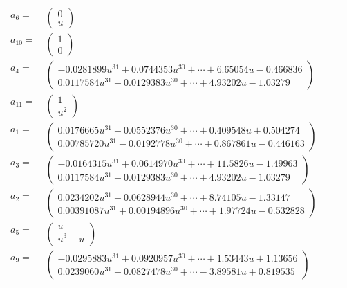\documentclass[1p]{elsarticle_modified}
\theoremstyle{definition}
\begin{document}
\begin{tabular}{m{7pt} m{180pt} m{7pt} m{180pt} }
\flushright $a_{6}=$&$\begin{pmatrix}0\\u\end{pmatrix}$ \\
\flushright $a_{10}=$&$\begin{pmatrix}1\\0\end{pmatrix}$ \\
\flushright $a_{4}=$&$\begin{pmatrix}-0.0281899 u^{31}+0.0744353 u^{30}+\cdots+6.65054 u-0.466836\\0.0117584 u^{31}-0.0129383 u^{30}+\cdots+4.93202 u-1.03279\end{pmatrix}$ \\
\flushright $a_{11}=$&$\begin{pmatrix}1\\u^2\end{pmatrix}$ \\
\flushright $a_{1}=$&$\begin{pmatrix}0.0176665 u^{31}-0.0552376 u^{30}+\cdots+0.409548 u+0.504274\\0.00785720 u^{31}-0.0192778 u^{30}+\cdots+0.867861 u-0.446163\end{pmatrix}$ \\
\flushright $a_{3}=$&$\begin{pmatrix}-0.0164315 u^{31}+0.0614970 u^{30}+\cdots+11.5826 u-1.49963\\0.0117584 u^{31}-0.0129383 u^{30}+\cdots+4.93202 u-1.03279\end{pmatrix}$ \\
\flushright $a_{2}=$&$\begin{pmatrix}0.0234202 u^{31}-0.0628944 u^{30}+\cdots+8.74105 u-1.33147\\0.00391087 u^{31}+0.00194896 u^{30}+\cdots+1.97724 u-0.532828\end{pmatrix}$ \\
\flushright $a_{5}=$&$\begin{pmatrix}u\\u^3+u\end{pmatrix}$ \\
\flushright $a_{9}=$&$\begin{pmatrix}-0.0295883 u^{31}+0.0920957 u^{30}+\cdots+1.53443 u+1.13656\\0.0239060 u^{31}-0.0827478 u^{30}+\cdots-3.89581 u+0.819535\end{pmatrix}$ \\

\end{tabular}
\end{document}
